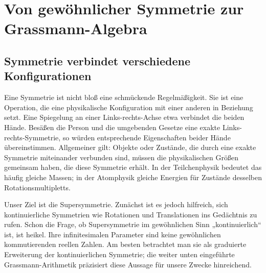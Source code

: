 \chapter{Von gewöhnlicher Symmetrie zur Grassmann-Algebra}


\section{Symmetrie verbindet verschiedene Konfigurationen}

Eine Symmetrie ist nicht bloß eine schmückende Regelmäßigkeit. Sie ist eine Operation, die eine physikalische Konfiguration mit einer anderen in Beziehung setzt. Eine Spiegelung an einer Links-rechts-Achse etwa verbindet die beiden Hände. Besäßen die Person und die umgebenden Gesetze eine exakte Links-rechts-Symmetrie, so würden entsprechende Eigenschaften beider Hände übereinstimmen. Allgemeiner gilt: Objekte oder Zustände, die durch eine exakte Symmetrie miteinander verbunden sind, müssen die physikalischen Größen gemeinsam haben, die diese Symmetrie erhält. In der Teilchenphysik bedeutet das häufig gleiche Massen; in der Atomphysik gleiche Energien für Zustände desselben Rotationsmultipletts.

Unser Ziel ist die Supersymmetrie. Zunächst ist es jedoch hilfreich, sich kontinuierliche Symmetrien wie Rotationen und Translationen ins Gedächtnis zu rufen. Schon die Frage, ob Supersymmetrie im gewöhnlichen Sinn „kontinuierlich“ ist, ist heikel. Ihre infinitesimalen Parameter sind keine gewöhnlichen kommutierenden reellen Zahlen. Am besten betrachtet man sie als graduierte Erweiterung der kontinuierlichen Symmetrie; die weiter unten eingeführte Grassmann-Arithmetik präzisiert diese Aussage für unsere Zwecke hinreichend. 

